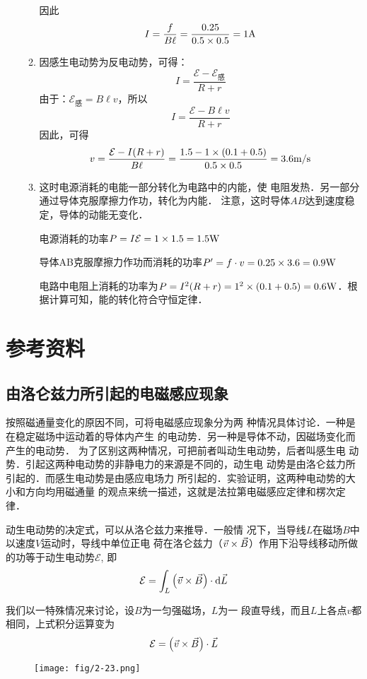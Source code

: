 \begin{enumerate}
\begin{solution}
\begin{enumerate}
    因此
    \[I=\frac{f}{B\ell}=\frac{0.25}{0.5\times 0.5}=1{\rm A}\]

    \item 因感生电动势为反电动势，可得：
    \[I=\frac{\mathcal{E}-\mathcal{E}_{\text{感}}}{R+r}\]
由于：$\mathcal{E}_{\text{感}}=B\ell v$，所以
\[I=\frac{\mathcal{E}-B\ell v}{R+r}\]
因此，可得
\[v=\frac{\mathcal{E}-I(R+r)}{B\ell }=\frac{1.5-1\times(0.1+0.5)}{0.5\times 0.5}=3.6\text{m}/\text{s}\]
\item 这时电源消耗的电能一部分转化为电路中的内能，使
电阻发热．另一部分通过导体克服摩擦力作功，转化为内能．
注意，这时导体$AB$达到速度稳定，导体的动能无变化．

电源消耗的功率$P=I\mathcal{E}=1\times1.5=1.5{\rm W}$

导体AB克服摩擦力作功而消耗的功率$P'=f\cdot v=0.25\times3.6=0.9{\rm W}$

电路中电阻上消耗的功率为$P=I^2(R+r)=1^2\times(0.1+0.5)=0.6{\rm W}$．根据计算可知，能的转化符合守恒定律．
\end{enumerate}
\end{solution}


\end{enumerate}


\section{参考资料}
\subsection{由洛仑兹力所引起的电磁感应现象}

按照磁通量变化的原因不同，可将电磁感应现象分为两
种情况具体讨论．一种是在稳定磁场中运动着的导体内产生
的电动势．另一种是导体不动，因磁场变化而产生的电动势．
为了区别这两种情况，可把前者叫动生电动势，后者叫感生电
动势．引起这两种电动势的非静电力的来源是不同的，动生电
动势是由洛仑兹力所引起的．而感生电动势是由感应电场力
所引起的．实验证明，这两种电动势的大小和方向均用磁通量
的观点来统一描述，这就是法拉第电磁感应定律和楞次定律．

动生电动势的决定式，可以从洛仑兹力来推导．一般情
况下，当导线$L$在磁场$B$中以速度$V$运动时，导线中单位正电
荷在洛仑兹力（$\vec{v}\times \vec{B}$）作用下沿导线移动所做的功等于动生电动势$\mathcal{E}$, 即
\[\mathcal{E}=\int_L \left(\vec{v}\times \vec{B}\right)\cdot \dd \vec{L}\]

我们以一特殊情况来讨论，设$B$为一匀强磁场，$L$为一
段直导线，而且$L$上各点$v$都相同，上式积分运算变为
\[\mathcal{E}=\left(\vec{v}\times \vec{B}\right)\cdot \vec{L}\]
\begin{figure}[htp]
    \centering
\texttt{[image: fig/2-23.png]}
    \caption{}
\end{figure}

